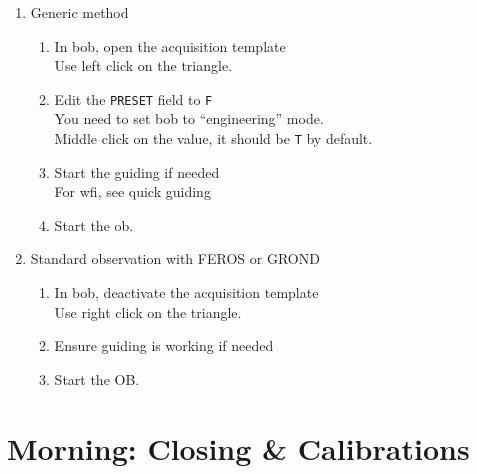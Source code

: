\documentclass[11pt,fleqn,a4paper]{book}
\begin{document}
\begin{enumerate}
    \item Generic method
    \begin{enumerate}
        \item In \gls{bob}, open the acquisition \gls{template}\\
          Use left click on the triangle.
        \item Edit the \texttt{PRESET} field to \texttt{F}\\
          You need to set bob to ``engineering'' mode.\\
          Middle click on the value, it should be \texttt{T} by default.
        \item Start the guiding if needed\\
              For \gls{wfi}, see quick guiding 
        \item Start the \gls{ob}.
    \end{enumerate}
    \item Standard observation with FEROS or GROND
    \begin{enumerate}
        \item In \gls{bob}, deactivate the \gls{acquisition} \gls{template}\\
              Use right click on the triangle.
        \item Ensure guiding is working if needed
        \item Start the OB.
    \end{enumerate}
\end{enumerate}
    
 
  

\chapter{Morning: Closing \& Calibrations}
\label{chap:closing}
\end{document}
